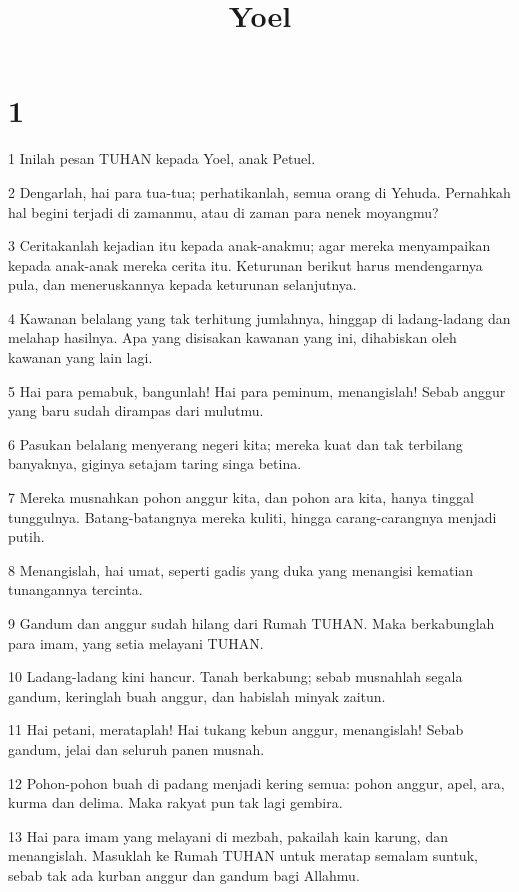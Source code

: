

\title{Yoel}


\chapter{1}

\par 1 Inilah pesan TUHAN kepada Yoel, anak Petuel.
\par 2 Dengarlah, hai para tua-tua; perhatikanlah, semua orang di Yehuda. Pernahkah hal begini terjadi di zamanmu, atau di zaman para nenek moyangmu?
\par 3 Ceritakanlah kejadian itu kepada anak-anakmu; agar mereka menyampaikan kepada anak-anak mereka cerita itu. Keturunan berikut harus mendengarnya pula, dan meneruskannya kepada keturunan selanjutnya.
\par 4 Kawanan belalang yang tak terhitung jumlahnya, hinggap di ladang-ladang dan melahap hasilnya. Apa yang disisakan kawanan yang ini, dihabiskan oleh kawanan yang lain lagi.
\par 5 Hai para pemabuk, bangunlah! Hai para peminum, menangislah! Sebab anggur yang baru sudah dirampas dari mulutmu.
\par 6 Pasukan belalang menyerang negeri kita; mereka kuat dan tak terbilang banyaknya, giginya setajam taring singa betina.
\par 7 Mereka musnahkan pohon anggur kita, dan pohon ara kita, hanya tinggal tunggulnya. Batang-batangnya mereka kuliti, hingga carang-carangnya menjadi putih.
\par 8 Menangislah, hai umat, seperti gadis yang duka yang menangisi kematian tunangannya tercinta.
\par 9 Gandum dan anggur sudah hilang dari Rumah TUHAN. Maka berkabunglah para imam, yang setia melayani TUHAN.
\par 10 Ladang-ladang kini hancur. Tanah berkabung; sebab musnahlah segala gandum, keringlah buah anggur, dan habislah minyak zaitun.
\par 11 Hai petani, merataplah! Hai tukang kebun anggur, menangislah! Sebab gandum, jelai dan seluruh panen musnah.
\par 12 Pohon-pohon buah di padang menjadi kering semua: pohon anggur, apel, ara, kurma dan delima. Maka rakyat pun tak lagi gembira.
\par 13 Hai para imam yang melayani di mezbah, pakailah kain karung, dan menangislah. Masuklah ke Rumah TUHAN untuk meratap semalam suntuk, sebab tak ada kurban anggur dan gandum bagi Allahmu.
